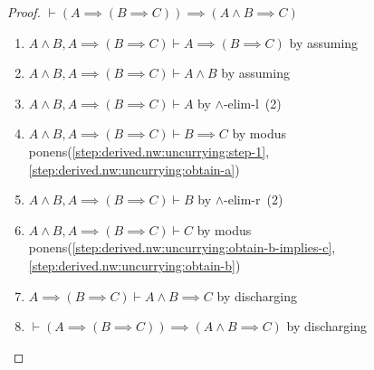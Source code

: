 \begin{proof}
$\vdash(A\implies(B\implies C))\implies(A\land B\implies C)$
\begin{enumerate}
\item\label{step:derived.nw:uncurrying:step-1} $A\land B,A\implies(B\implies C)\vdash A\implies(B\implies C)$ by assuming
\item $A\land B,A\implies(B\implies C)\vdash A\land B$ by assuming
\item\label{step:derived.nw:uncurrying:obtain-a} $A\land B,A\implies(B\implies C)\vdash A$ by $\land$-elim-l~(2)
\item\label{step:derived.nw:uncurrying:obtain-b-implies-c} $A\land B,A\implies(B\implies C)\vdash B\implies C$ by modus ponens(\ref{step:derived.nw:uncurrying:step-1}, \ref{step:derived.nw:uncurrying:obtain-a})
\item\label{step:derived.nw:uncurrying:obtain-b} $A\land B,A\implies(B\implies C)\vdash B$ by $\land$-elim-r~(2)
\item $A\land B,A\implies(B\implies C)\vdash C$ by modus ponens(\ref{step:derived.nw:uncurrying:obtain-b-implies-c}, \ref{step:derived.nw:uncurrying:obtain-b})
\item $A\implies(B\implies C)\vdash A\land B\implies C$ by discharging
\item $\vdash(A\implies(B\implies C))\implies(A\land B\implies C)$ by discharging\qedhere
\end{enumerate}
\end{proof}

